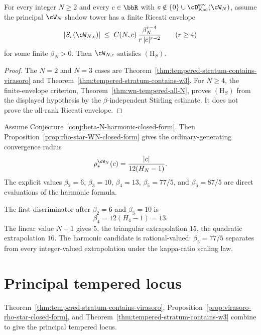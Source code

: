 \begin{theorem}
\label{conj:wn-tempered-general}
For every integer $N \ge 2$ and every $c \in \bbR$ with
$c \notin \{0\} \cup \cD^{\mathrm{sev}}_{\mathrm{Kac}}(\cW_N)$, assume
the principal $\cW_N$ shadow tower has a finite Riccati envelope
\[
 \lvert S_r(\cW_{N,c}) \rvert
 \;\le\;
 C(N,c)\,\frac{\beta_N^{r-4}}{r\,|c|^{r-2}}
 \qquad (r\ge 4)
\]
for some finite $\beta_N>0$. Then $\cW_{N, c}$ satisfies
$(\mathrm{H}_S)$.
\end{theorem}

\begin{proof}
The $N=2$ and $N=3$ cases are
Theorem~\ref{thm:tempered-stratum-contains-virasoro} and
Theorem~\ref{thm:tempered-stratum-contains-w3}. For $N\ge4$, the
finite-envelope criterion, Theorem~\ref{thm:wn-tempered-all-N}, proves
$(\mathrm{H}_S)$ from the displayed hypothesis by the
$\beta$-independent Stirling estimate. It does not prove the all-rank
Riccati envelope.
\end{proof}

\begin{remark}
\label{rem:wn-conditional-harmonic-radius}
Assume Conjecture~\ref{conj:beta-N-harmonic-closed-form}. Then
Proposition~\ref{prop:rho-star-WN-closed-form} gives the
ordinary-generating convergence radius
\[
 \rho_*^{\cW_N}(c)
 =
 \frac{\lvert c\rvert}{12(H_N-1)}.
\]
The explicit values
\(\beta_2=6\), \(\beta_3=10\), \(\beta_4=13\),
\(\beta_5=77/5\), and \(\beta_6=87/5\) are direct evaluations of the
harmonic formula.
\end{remark}

\begin{remark}
\label{rem:w4-numerical-probe}
The first discriminator after $\beta_2=6$ and $\beta_3=10$ is
\[
 \beta_4=12(H_4-1)=13.
\]
The linear value $N+1$ gives $5$, the triangular extrapolation $15$,
the quadratic extrapolation $16$. The harmonic candidate is
rational-valued: $\beta_5=77/5$ separates from every integer-valued
extrapolation under the kappa-ratio scaling law.
\end{remark}

\section{Principal tempered locus}
\label{sec:healed-dichotomy}

Theorem~\ref{thm:tempered-stratum-contains-virasoro},
Proposition~\ref{prop:virasoro-rho-star-closed-form}, and
Theorem~\ref{thm:tempered-stratum-contains-w3} combine to give the
principal tempered locus.

